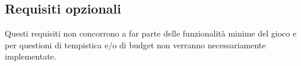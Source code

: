 \subsection{Requisiti opzionali}

\textsf{\small Questi requisiti non concorrono a far parte delle funzionalità minime del gioco e per questioni di tempistica e/o di budget non verranno necessariamente implementate.}\\

